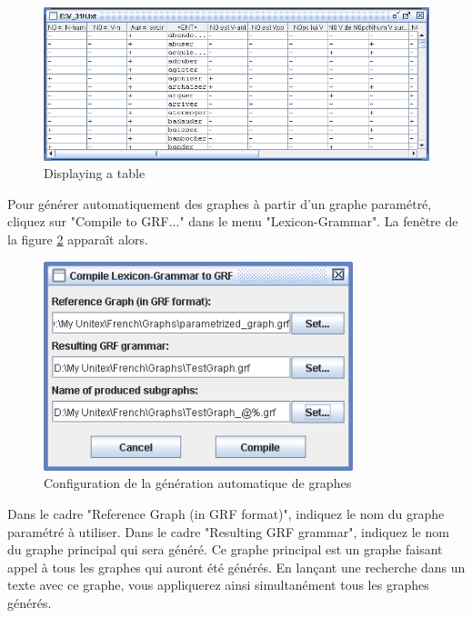 \begin{figure}[!h]
\begin{center}
\includegraphics[width=15cm]{resources/img/fig8-6.png}
\caption{Displaying a table\label{fig-table-display}}
\end{center}
\end{figure}

\bigskip
\noindent  Pour générer automatiquement des graphes à partir d’un graphe paramétré, cliquez sur
"Compile to GRF..." dans le menu "Lexicon-Grammar". La fenêtre de la figure
\ref{fig-configuration-graph-generation} apparaît alors.


\begin{figure}[!h]
\begin{center}
\includegraphics[width=9cm]{resources/img/fig8-7.png}
\caption{Configuration de la génération automatique de graphes\label{fig-configuration-graph-generation}}
\end{center}
\end{figure}

\bigskip
\noindent Dans le cadre "Reference Graph (in GRF format)", indiquez le nom du graphe paramétré
à utiliser. Dans le cadre "Resulting GRF grammar", indiquez le nom du graphe principal qui
sera généré. Ce graphe principal est un graphe faisant appel à tous les graphes qui auront
été générés. En lançant une recherche dans un texte avec ce graphe, vous appliquerez ainsi
simultanément tous les graphes générés.


